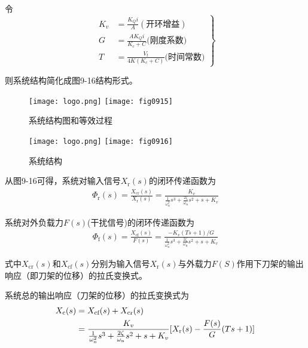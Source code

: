 \noindent 令
\begin{equation}
\left.\begin{aligned}
K_{v}&=\frac{K_{Q}i}{A}(\text{开环增益}) \\
G&=\frac{AK_{Q}i}{K_{c}+C}\text{(刚度系数)} \\
T&=\frac{V_{t}}{4K(K_{c}+C)}\text{(时间常数)}
\end{aligned}\right\}
\end{equation}

\noindent 则系统结构简化成图9-16结构形式。

\begin{figure}[!hbt]
    \centering
    \ifOpenSource
    \texttt{[image: logo.png]}
    \else
    \texttt{[image: fig0915]}
    \fi
    \caption{系统结构图和等效过程}
    \label{fig:fig0915}
\end{figure}

\begin{figure}[!hbt]
    \centering
    \ifOpenSource
    \texttt{[image: logo.png]}
    \else
    \texttt{[image: fig0916]}
    \fi
    \caption{系统结构}
    \label{fig:fig0916}
\end{figure}

从图9-16可得，系统对输入信号$X_{\text{r}}(s)$的闭环传递函数为
\begin{align}
    \varPhi_{\text{r}}(s)=\frac{X_{\text{cr}}(s)}{X_{\text{r}}(s)}=\frac{K_{v}}{\frac{1}{\omega_{\text{n}}^2}s^3+\frac{2\zeta }{\omega_{\text{n}}}s^2+s+K_{v}}
\end{align}

\noindent 系统对外负载力$F(s)$(干扰信号)的闭环传递函数为
\begin{align}
    \varPhi_{\text{f}}(s)=\frac{X_{\text{cf}}(s)}{F(s)}=\frac{-K_{v}(Ts+1)/G}{\frac{1}{\omega_{\text{n}}^2}s^3+\frac{2\zeta }{\omega_{\text{n}}}s^2+s+K_{v}}
\end{align}

\noindent 式中$X_{\text{cr}}(s)$和$X_{\text{cf}}(s)$分别为输入信号$X_{\text{r}}(s)$与外载力$F(S)$作用下刀架的输出响应（即刀架的位移）的拉氏变换式。

系统总的输出响应（刀架的位移）的拉氏变换式为
\begin{align}
    X_{\text{c}}(s)&=X_{\text{cf}}(s)+X_{\text{cr}}(s) \notag \\
    &=\frac{K_{v}}{\frac{1}{\omega_{\text{n}}^2}s^3+\frac{2\zeta }{\omega_{\text{n}}}s^2+s+K_{v}}[X_{\text{r}}(s)-\frac{F(s)}{G}(Ts+1)]
\end{align}

